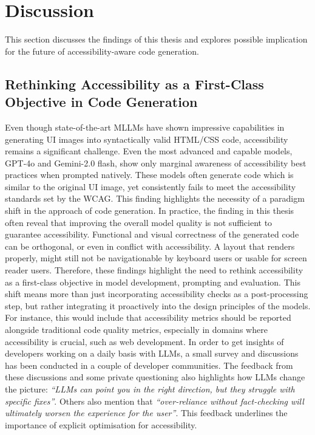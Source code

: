 \chapter{Discussion}\label{chapter:discussion}
This section discusses the findings of this thesis 
and explores possible implication for the future 
of accessibility-aware code generation.

\section{Rethinking Accessibility as a First-Class Objective in Code Generation}
Even though state-of-the-art MLLMs have shown impressive 
capabilities in generating UI images into syntactically 
valid HTML/CSS code, accessibility remains a significant 
challenge. Even the most advanced and capable models, 
GPT-4o and Gemini-2.0 flash, show only marginal awareness 
of accessibility best practices when prompted natively. 
These models often generate code which is similar to the 
original UI image, yet consistently fails to meet 
the accessibility standards set by the WCAG.
This finding highlights the necessity of a paradigm 
shift in the approach of code generation. 
In practice, the finding in this thesis 
often reveal that improving 
the overall model quality is not sufficient to guarantee
accessibility. 
Functional and visual correctness of the generated code 
can be orthogonal, or even in conflict with accessibility. 
A layout that renders properly, might still not be navigationable 
by keyboard users or usable for screen reader users.\newline 
Therefore, these findings highlight the need to rethink 
accessibility as a first-class objective in model
development, prompting and evaluation. This shift 
means more than just incorporating accessibility 
checks as a post-processing step, but rather
integrating it proactively into the design principles 
of the models. For instance, this would include that 
accessibility metrics should be reported alongside traditional 
code quality metrics, especially in domains 
where accessibility is crucial, such as web development.\newline 
In order to get insights of developers working on 
a daily basis with LLMs, a small survey and discussions~\cite{feng2025ux, lutz2025mot} 
has been conducted in a couple of developer communities.
The feedback from these discussions and some private 
questioning also highlights how 
LLMs change the picture: \textit{``LLMs can point 
you in the right direction, but they struggle with specific fixes''}.
Others also mention that \textit{``over-reliance without fact-checking will 
ultimately worsen the experience for the user''}. This 
feedback underlines the importance of explicit 
optimisation for accessibility.


